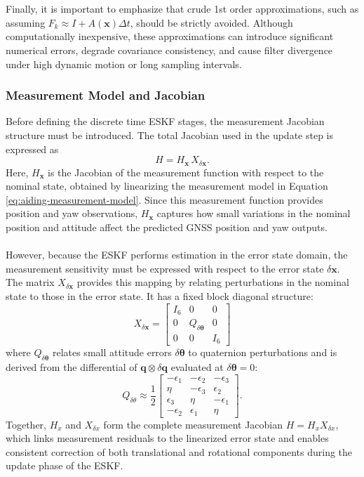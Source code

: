\\ \\
Finally, it is important to emphasize that crude 1st order approximations, such as assuming $F_k \approx I + A(\mathbf{x})\Delta t$, should be strictly avoided. Although computationally inexpensive, these approximations can introduce significant numerical errors, degrade covariance consistency, and cause filter divergence under high dynamic motion or long sampling intervals.



\subsubsection{Measurement Model and Jacobian}
Before defining the discrete time ESKF stages, the measurement Jacobian structure must be introduced. The total Jacobian used in the update step is expressed as
$$
    H = H_{\mathbf{x}} \, X_{\delta \mathbf{x}}.
$$
Here, $H_{\mathbf{x}}$ is the Jacobian of the measurement function with respect to the nominal state, obtained by linearizing the measurement model in Equation \ref{eq:aiding-measurement-model}. Since this measurement function provides position and yaw observations, $H_{\mathbf{x}}$ captures how small variations in the nominal position and attitude affect the predicted GNSS position and yaw outputs.  
\\ \\
However, because the ESKF performs estimation in the error state domain, the measurement sensitivity must be expressed with respect to the error state $\delta\mathbf{x}$. The matrix $X_{\delta \mathbf{x}}$ provides this mapping by relating perturbations in the nominal state to those in the error state. It has a fixed block diagonal structure:
$$
    X_{\delta \mathbf{x}} =
    \begin{bmatrix}
        I_6 & 0 & 0 \\
        0 & Q_{\delta\boldsymbol{\theta}} & 0 \\
        0 & 0 & I_6
    \end{bmatrix}
$$
where $Q_{\delta\boldsymbol{\theta}}$ relates small attitude errors $\delta\boldsymbol{\theta}$ to quaternion perturbations and is derived from the differential of $\mathbf{q} \otimes \delta\mathbf{q}$ evaluated at $\delta\boldsymbol{\theta}=0$:
$$
    Q_{\delta\theta} \approx
    \frac{1}{2}
    \begin{bmatrix}
        -\epsilon_1 & -\epsilon_2 & -\epsilon_3 \\
         \eta & -\epsilon_3 & \epsilon_2 \\
         \epsilon_3 & \eta & -\epsilon_1 \\
        -\epsilon_2 & \epsilon_1 & \eta
    \end{bmatrix}.
$$
Together, $H_x$ and $X_{\delta x}$ form the complete measurement Jacobian $H = H_x X_{\delta x}$, which links measurement residuals to the linearized error state and enables consistent correction of both translational and rotational components during the update phase of the ESKF.



